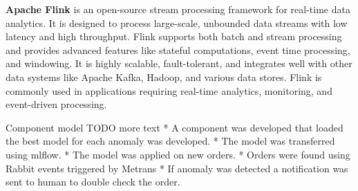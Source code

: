 {\bf Apache Flink} is an open-source stream processing framework for real-time data analytics. It is designed to process large-scale, unbounded data streams with low latency and high throughput. Flink supports both batch and stream processing and provides advanced features like stateful computations, event time processing, and windowing. It is highly scalable, fault-tolerant, and integrates well with other data systems like Apache Kafka, Hadoop, and various data stores. Flink is commonly used in applications requiring real-time analytics, monitoring, and event-driven processing.

\sec Component model
TODO more text
\begitems
* A component was developed that loaded the best model for each anomaly was developed.
* The model was transferred using mlflow.
* The model was applied on new orders.
* Orders were found using Rabbit events triggered by Metrans
* If anomaly was detected a notification was sent to human to double check the order.
\enditems